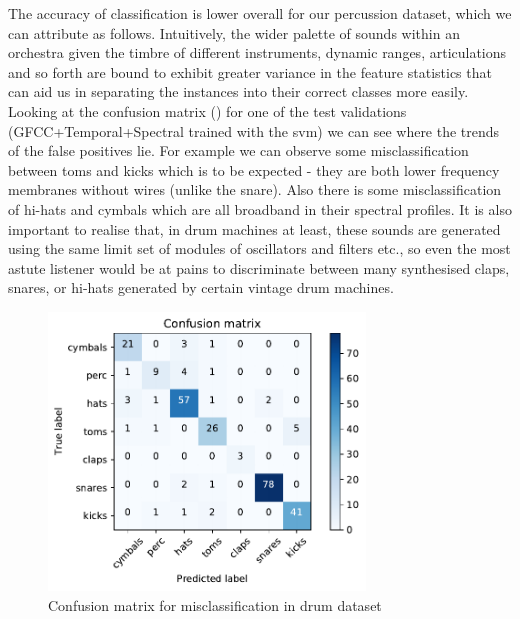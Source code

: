 {{{{{{{The accuracy of classification is lower overall for our percussion dataset, which we can attribute as follows. Intuitively, the wider palette of sounds within an orchestra given the timbre of different instruments, dynamic ranges, articulations and so forth are bound to exhibit greater variance in the feature statistics that can aid us in separating the instances into their correct classes more easily. Looking at the confusion matrix () for one of the test validations (GFCC+Temporal+Spectral trained with the \acrshort{svm}) we can see where the trends of the false positives lie. For example we can observe some misclassification between toms and kicks which is to be expected - they are both lower frequency membranes without wires (unlike the snare). Also there is some misclassification of hi-hats and cymbals which are all broadband in their spectral profiles. It is also important to realise that, in drum machines at least, these sounds are generated using the same limit set of modules of oscillators and filters etc., so even the most astute listener would be at pains to discriminate between many synthesised claps, snares, or hi-hats generated by  certain vintage drum machines.

\begin{figure}
	\begin{center}
		\includegraphics[width=0.75\textwidth]{ch05_pyconcat/figures/drum_confusion.pdf}
	\end{center}
	\caption[Confusion matrix for misclassification in drum dataset]{Confusion matrix for misclassification in drum dataset}
	\label{fig:drum_confusion}
\end{figure}

}}}}}}}
